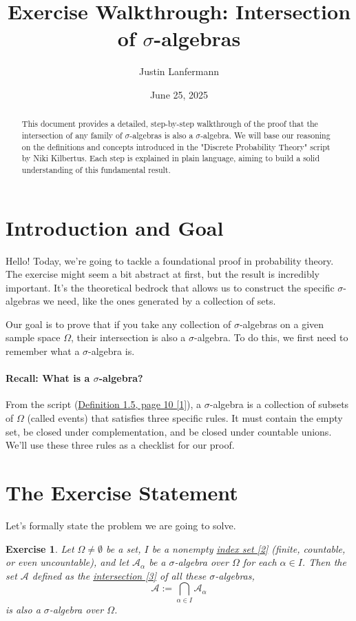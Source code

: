 \documentclass[11pt,a4paper]{article}
\title{\textbf{Exercise Walkthrough: Intersection of $\sigma$-algebras}}
\author{Justin Lanfermann}
\date{June 25, 2025}
\theoremstyle{tutorstyle}
\newtheorem{exercise}{Exercise}
\begin{document}
\maketitle

\begin{abstract}
    This document provides a detailed, step-by-step walkthrough of the proof that the intersection of any family of $\sigma$-algebras is also a $\sigma$-algebra. We will base our reasoning on the definitions and concepts introduced in the "Discrete Probability Theory" script by Niki Kilbertus. Each step is explained in plain language, aiming to build a solid understanding of this fundamental result.
\end{abstract}

\section{Introduction and Goal}

Hello! Today, we're going to tackle a foundational proof in probability theory. The exercise might seem a bit abstract at first, but the result is incredibly important. It's the theoretical bedrock that allows us to construct the specific $\sigma$-algebras we need, like the ones generated by a collection of sets.

Our goal is to prove that if you take any collection of $\sigma$-algebras on a given sample space $\Omega$, their intersection is also a $\sigma$-algebra. To do this, we first need to remember what a $\sigma$-algebra is.

\paragraph{Recall: What is a $\sigma$-algebra?}
From the script (\hyperlink{note1}{Definition 1.5, page 10 [1]}), a $\sigma$-algebra is a collection of subsets of $\Omega$ (called events) that satisfies three specific rules. It must contain the empty set, be closed under complementation, and be closed under countable unions. We'll use these three rules as a checklist for our proof.

\section{The Exercise Statement}

Let's formally state the problem we are going to solve.

\begin{exercise}
Let $\Omega \neq \emptyset$ be a set, $I$ be a nonempty \hyperlink{note2}{index set [2]} (finite, countable, or even uncountable), and let $\mathcal{A}_{\alpha}$ be a $\sigma$-algebra over $\Omega$ for each $\alpha \in I$. Then the set $\mathcal{A}$ defined as the \hyperlink{note3}{intersection [3]} of all these $\sigma$-algebras,
\[ \mathcal{A} := \bigcap_{\alpha \in I} \mathcal{A}_{\alpha} \]
is also a $\sigma$-algebra over $\Omega$.
\end{exercise}
\end{document}
